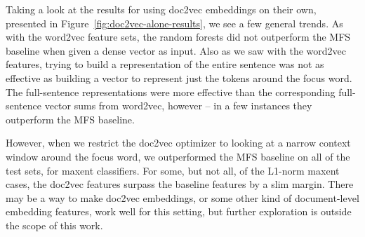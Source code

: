 Taking a look at the results for using doc2vec embeddings on their own,
presented in Figure~\ref{fig:doc2vec-alone-results}, we see a few general
trends. As with the word2vec feature sets, the random forests did not
outperform the MFS baseline when given a dense vector as input. Also as we saw
with the word2vec features, trying to build a representation of the
entire sentence was not as effective as building a vector to represent just the
tokens around the focus word.
The full-sentence representations were more effective than the corresponding
full-sentence vector sums from word2vec, however -- in a few instances they
outperform the MFS baseline.

However, when we restrict the doc2vec optimizer to looking at a narrow context
window around the focus word, we outperformed the MFS baseline on all of the
test sets, for maxent classifiers. For some, but not all, of the L1-norm
maxent cases, the doc2vec features surpass the baseline features by a slim
margin. There may be a way to make doc2vec embeddings, or some other kind of
document-level embedding features, work well for this setting, but further
exploration is outside the scope of this work.

